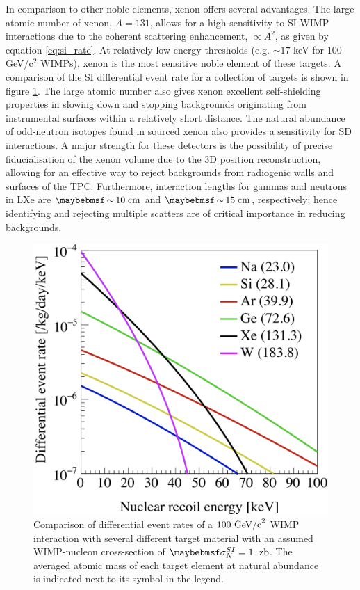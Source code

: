 In comparison to other noble elements, xenon offers several advantages. The large atomic number of xenon, $A=131$, allows for a high sensitivity to SI-WIMP interactions due to the coherent scattering enhancement, $\propto A^2$, as given by equation \ref{eq:si_rate}. At relatively low energy thresholds (e.g. $\sim17$ keV for 100 GeV/c$^2$ WIMPs), xenon is the most sensitive noble element of these targets. A comparison of the SI differential event rate for a collection of targets is shown in figure \ref{fig:nuclear_recoil_rates}. The large atomic number also gives xenon excellent self-shielding properties in slowing down and stopping backgrounds originating from instrumental surfaces within a relatively short distance. The natural abundance of odd-neutron isotopes found in sourced xenon also provides a sensitivity for SD interactions. A major strength for these detectors is the possibility of precise fiducialisation of the xenon volume due to the 3D position reconstruction, allowing for an effective way to reject backgrounds from radiogenic walls and surfaces of the TPC. Furthermore, interaction lengths for gammas and neutrons in LXe are $\sim10 \; \MathText{cm}$ and $\sim15 \; \MathText{cm}$, respectively; hence identifying and rejecting multiple scatters are of critical importance in reducing backgrounds.
%
\begin{figure}[hb!]
    \begin{center}
        \includegraphics[scale=0.30]{Chapter_2/Figures/SI_nuclear_recoil_rates.png}
        \caption[Comparison of differential event rates of a $100 \; \MathText{GeV/c}^{2}$ WIMP interaction with several different target material, for an assumed cross-section of $\sigma^{SI}_{N} = 1 \; \MathText{zb}$]%
        {Comparison of differential event rates of a $100 \text{ GeV/c}^{2}$ WIMP interaction with several different target material with an assumed WIMP-nucleon cross-section of $\sigma^{SI}_{N} = 1 \; \MathText{ zb}$. The averaged atomic mass of each target element at natural abundance is indicated next to its symbol in the legend.}
        \label{fig:nuclear_recoil_rates}
        \end{center}
\end{figure}
